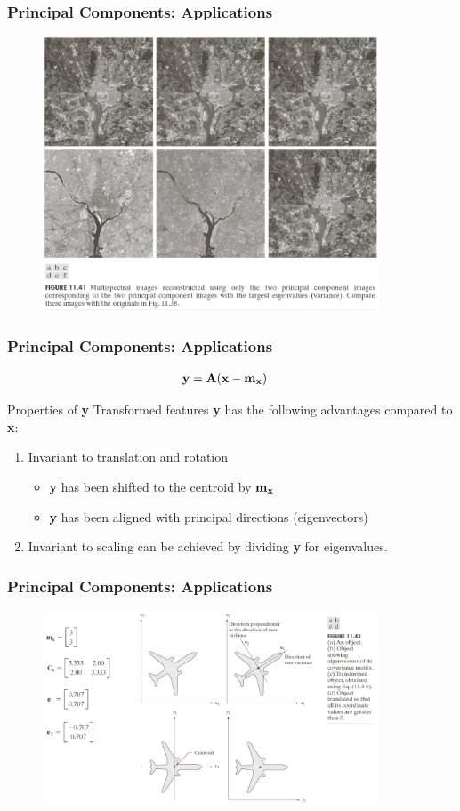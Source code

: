 \documentclass[english,11pt,table,handout]{beamer}
\begin{document}
\frame
{
	\frametitle{Principal Components: Applications}
	\begin{figure}
		\includegraphics[width=10cm]{pca_2.png}
	\end{figure}
}


\frame
{
	\frametitle{Principal Components: Applications}
	\large	
	
	\begin{equation}
	\nonumber
	\begin{split}
	\text{\textbf{y}} 
	&= \text{\textbf{A}} (\text{\textbf{x}} - \text{\textbf{m}}_\text{\textbf{x}})
	\end{split}
	\end{equation}
	\begin{alertblock}{Properties of \textbf{y} }
		Transformed features \textbf{y} has the following advantages compared to \textbf{x}:
		
		\begin{enumerate}
			\item Invariant to translation and rotation 
			\begin{itemize}
				\item \textbf{y} has been shifted to the centroid by $\text{\textbf{m}}_\text{\textbf{x}}$
				\item \textbf{y} has been aligned with principal directions (eigenvectors)
			\end{itemize}
			\item Invariant to scaling can be achieved by dividing \textbf{y} for eigenvalues.
			
		\end{enumerate}
	\end{alertblock}
	
}

\frame
{
	\frametitle{Principal Components: Applications}
	\begin{figure}
		\includegraphics[width=10cm]{pca_3.png}
	\end{figure}
}



\end{document}
